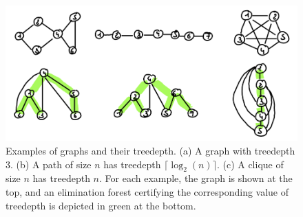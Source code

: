 \begin{figure}
    \includegraphics[width=\textwidth]{figures/treedepth-example.png}
    \caption{Examples of graphs and their treedepth. (a) A graph with treedepth 3. (b) A path of size $n$ has treedepth $\lceil\log_2(n)\rceil$. (c) A clique of size $n$ has treedepth $n$. For each example, the graph is shown at the top, and an elimination forest certifying the corresponding value of treedepth is depicted in green at the bottom.}
    \label{fig:treedepth-example}
\end{figure}
